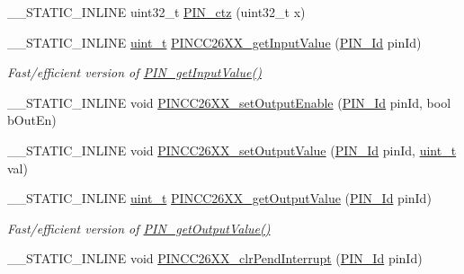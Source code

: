 \begin{DoxyCompactItemize}
\item 
\+\_\+\+\_\+\+S\+T\+A\+T\+I\+C\+\_\+\+I\+N\+L\+I\+N\+E uint32\+\_\+t \hyperlink{_p_i_n_c_c26_x_x_8h_a94ac62e1f4e034d392ef5827bb2ab763}{P\+I\+N\+\_\+ctz} (uint32\+\_\+t x)
\item 
\+\_\+\+\_\+\+S\+T\+A\+T\+I\+C\+\_\+\+I\+N\+L\+I\+N\+E \hyperlink{_p_i_n_8h_a12a1e9b3ce141648783a82445d02b58d}{uint\+\_\+t} \hyperlink{_p_i_n_c_c26_x_x_8h_a08ed2ad0cefced9fb2224edf5a040be5}{P\+I\+N\+C\+C26\+X\+X\+\_\+get\+Input\+Value} (\hyperlink{_p_i_n_8h_a9ae8197f460bb76ea09a84f47d09921f}{P\+I\+N\+\_\+\+Id} pin\+Id)
\begin{DoxyCompactList}\small\item\em Fast/efficient version of \hyperlink{_p_i_n_8h_a9bfcc2ddeaaac6dcd90d31ff0c125f3d}{P\+I\+N\+\_\+get\+Input\+Value()} \end{DoxyCompactList}\item 
\+\_\+\+\_\+\+S\+T\+A\+T\+I\+C\+\_\+\+I\+N\+L\+I\+N\+E void \hyperlink{_p_i_n_c_c26_x_x_8h_acd27e505982c7ece583d405d6d9f6027}{P\+I\+N\+C\+C26\+X\+X\+\_\+set\+Output\+Enable} (\hyperlink{_p_i_n_8h_a9ae8197f460bb76ea09a84f47d09921f}{P\+I\+N\+\_\+\+Id} pin\+Id, bool b\+Out\+En)
\item 
\+\_\+\+\_\+\+S\+T\+A\+T\+I\+C\+\_\+\+I\+N\+L\+I\+N\+E void \hyperlink{_p_i_n_c_c26_x_x_8h_a97732e0803b68d0094930bfcc04e53c6}{P\+I\+N\+C\+C26\+X\+X\+\_\+set\+Output\+Value} (\hyperlink{_p_i_n_8h_a9ae8197f460bb76ea09a84f47d09921f}{P\+I\+N\+\_\+\+Id} pin\+Id, \hyperlink{_p_i_n_8h_a12a1e9b3ce141648783a82445d02b58d}{uint\+\_\+t} val)
\item 
\+\_\+\+\_\+\+S\+T\+A\+T\+I\+C\+\_\+\+I\+N\+L\+I\+N\+E \hyperlink{_p_i_n_8h_a12a1e9b3ce141648783a82445d02b58d}{uint\+\_\+t} \hyperlink{_p_i_n_c_c26_x_x_8h_a487a8fe91cce4d7121897be4fb6534cf}{P\+I\+N\+C\+C26\+X\+X\+\_\+get\+Output\+Value} (\hyperlink{_p_i_n_8h_a9ae8197f460bb76ea09a84f47d09921f}{P\+I\+N\+\_\+\+Id} pin\+Id)
\begin{DoxyCompactList}\small\item\em Fast/efficient version of \hyperlink{_p_i_n_8h_a4a05603f0e075a37af59ed66fd6c6443}{P\+I\+N\+\_\+get\+Output\+Value()} \end{DoxyCompactList}\item 
\+\_\+\+\_\+\+S\+T\+A\+T\+I\+C\+\_\+\+I\+N\+L\+I\+N\+E void \hyperlink{_p_i_n_c_c26_x_x_8h_a9e8be001ff8ca9946dce5668685befae}{P\+I\+N\+C\+C26\+X\+X\+\_\+clr\+Pend\+Interrupt} (\hyperlink{_p_i_n_8h_a9ae8197f460bb76ea09a84f47d09921f}{P\+I\+N\+\_\+\+Id} pin\+Id)

\end{DoxyCompactItemize}

